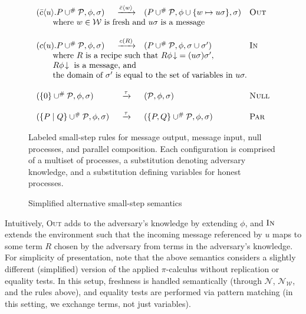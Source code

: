 \documentclass{article}
\theoremstyle{definition}
\begin{document}
\begin{figure}
    \centering
\[
\begin{array}{lcll}
(\bar{c}\langle u\rangle.P \cup^{\#} \mathcal{P}, \phi, \sigma)
& \xrightarrow{\bar{c}\langle w\rangle} &
(P \cup^{\#} \mathcal{P}, \phi \cup \{w \mapsto u\sigma\}, \sigma)
& \textsc{Out} \\
\multicolumn{4}{l}{\qquad\text{where $w\in\mathcal{W}$ is fresh and $u\sigma$ is a message}} \\[1.2em]
(c(u).P \cup^{\#} \mathcal{P}, \phi, \sigma)
& \xrightarrow{c(R)} &
(P \cup^{\#} \mathcal{P}, \phi, \sigma \cup \sigma')
& \textsc{In} \\
\multicolumn{4}{l}{%
\qquad\text{where }R\text{ is a recipe such that }R\phi\!\downarrow\; = (u\sigma)\sigma',} \\ 
\multicolumn{4}{l}{%
\qquad R\phi\!\downarrow\text{ is a message, and}}  \\
\multicolumn{4}{l} {\qquad
\text{the domain of } \sigma' \text{ is equal to the set of variables in }u\sigma.
} \\[1.2em]
(\{0\} \cup^{\#} \mathcal{P}, \phi, \sigma)
& \xrightarrow{\tau} &
(\mathcal{P}, \phi, \sigma)
& \textsc{Null} \\[1.2em]
(\{P \mid Q\} \cup^{\#} \mathcal{P}, \phi, \sigma)
& \xrightarrow{\tau} &
(\{P,Q\}\cup^{\#}\mathcal{P}, \phi, \sigma)
& \textsc{Par}
\end{array}
\]
\begin{flushleft}
   {\footnotesize Labeled small-step rules for message output, message input, null processes, and parallel composition. 
   Each configuration is comprised of a multiset of processes, a substitution denoting adversary knowledge, 
   and a substitution defining variables for honest processes.
   } 
\end{flushleft}
    \caption{Simplified alternative small-step semantics}\label{fig:alternative-small-step}
\end{figure}


Intuitively, \textsc{Out} adds to the adversary's knowledge by extending $\phi$, 
and $\textsc{In}$ extends the environment such that the incoming message referenced by $u$ maps to some term $R$ 
chosen by the adversary from terms in the adversary's knowledge. For simplicity of presentation, 
note that the above semantics considers a slightly different (simplified) version of the applied 
$\pi$-calculus without replication or equality tests. In this setup, freshness is handled semantically 
(through $\mathcal{N}$, $\mathcal{N}_{\mathcal{W}}$, and the rules above), 
and equality tests are performed via pattern matching (in this setting, we exchange terms, not just variables).
\end{document}
